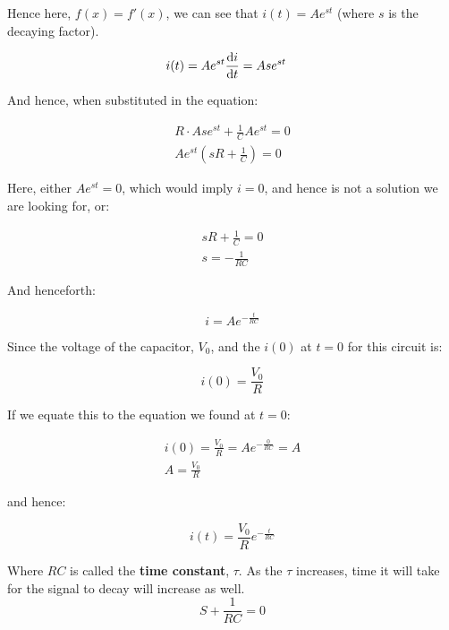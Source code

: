 \documentclass[11pt,a4paper]{book}
\begin{document}
Hence here, $f(x) = f'(x)$, we can see that $i(t) = Ae^{st}$ (where $s$ is the decaying factor).

\begin{align*}
i(t) &= Ae^{st}
\frac{\text{d} i}{\text{d} t} = Ase^{st}
\end{align*}

And hence, when substituted in the equation: 

\begin{align*}
R \cdot Ase^{st} + \frac{1}{C}Ae^{st} = 0\\
Ae^{st} \left(sR + \frac{1}{C} \right) = 0
\end{align*}

Here, either $Ae^{st} = 0$, which would imply $i = 0$, and hence is not a solution we are looking for, or:

\begin{align*}
sR + \frac{1}{C} = 0\\
s = -\frac{1}{RC}
\end{align*}

And henceforth:

\begin{equation}
i = Ae^{-\frac{t}{RC}}
\end{equation}

Since  the voltage of the capacitor, $V_0$, and the $i(0)$ at $t= 0$ for this circuit is:

\begin{equation}
i(0) = \frac{V_0}{R}
\end{equation}

If we equate this to the equation we found at $t=0$:

\begin{align*}
i(0) = \frac{V_0}{R} = Ae^{-\frac{0}{RC}} = A\\
A = \frac{V_0}{R}
\end{align*}

and hence:

\begin{equation}
i(t) = \frac{V_0}{R}e^{-\frac{t}{RC}}
\end{equation}

Where $RC$ is called the \textbf{time constant}, $\tau$. As the $\tau$ increases, time it will take for the signal to decay will increase as well.\\

\begin{equation}
S + \frac{1}{RC} = 0
\end{equation}
\end{document}
